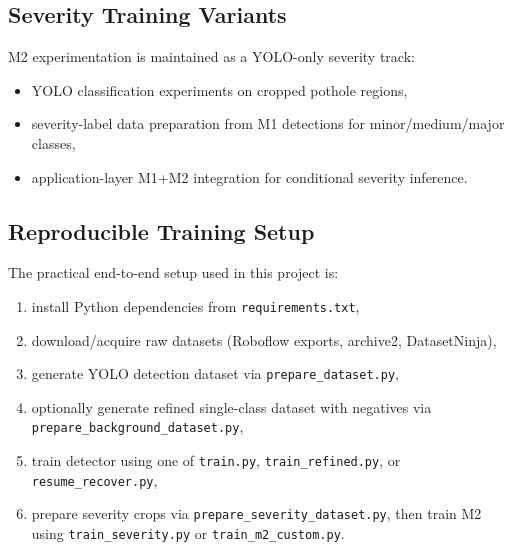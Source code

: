 \documentclass[twocolumn]{article}
\begin{document}
\begin{table}[H]
\centering
\caption{M1 Training Phases and Configuration Evolution}
\label{tab:training_phases}
\end{table}

\subsection{Severity Training Variants}
M2 experimentation is maintained as a YOLO-only severity track:
\begin{itemize}
    \item YOLO classification experiments on cropped pothole regions,
    \item severity-label data preparation from M1 detections for minor/medium/major classes,
    \item application-layer M1+M2 integration for conditional severity inference.
\end{itemize}

\subsection{Reproducible Training Setup}
The practical end-to-end setup used in this project is:
\begin{enumerate}
    \item install Python dependencies from \texttt{requirements.txt},
    \item download/acquire raw datasets (Roboflow exports, archive2, DatasetNinja),
    \item generate YOLO detection dataset via \texttt{prepare\_dataset.py},
    \item optionally generate refined single-class dataset with negatives via \texttt{prepare\_background\_dataset.py},
    \item train detector using one of \texttt{train.py}, \texttt{train\_refined.py}, or \texttt{resume\_recover.py},
    \item prepare severity crops via \texttt{prepare\_severity\_dataset.py}, then train M2 using \texttt{train\_severity.py} or \texttt{train\_m2\_custom.py}.
\end{enumerate}
\end{document}
